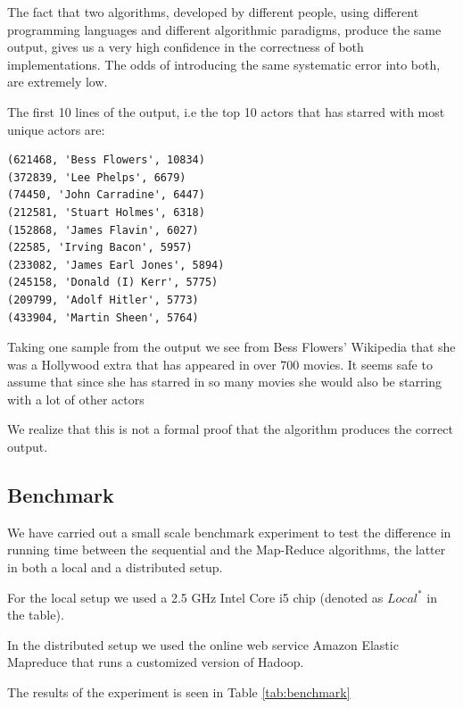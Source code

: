 \documentclass[a4paper,11pt]{article}
\begin{document}
The fact that two algorithms, developed by different people, using different programming languages and different algorithmic paradigms, produce the same output, gives us a very high confidence in the correctness of both implementations. The odds of introducing the same systematic error into both, are extremely low.

The first 10 lines of the output, i.e the top 10 actors that has starred with most unique actors are: 
\begin{verbatim}
(621468, 'Bess Flowers', 10834)
(372839, 'Lee Phelps', 6679)
(74450, 'John Carradine', 6447)
(212581, 'Stuart Holmes', 6318)
(152868, 'James Flavin', 6027)
(22585, 'Irving Bacon', 5957)
(233082, 'James Earl Jones', 5894)
(245158, 'Donald (I) Kerr', 5775)
(209799, 'Adolf Hitler', 5773)
(433904, 'Martin Sheen', 5764)
\end{verbatim}

Taking one sample from the output we see from Bess Flowers' Wikipedia that she was a Hollywood extra that has appeared in over 700 movies. It seems safe to assume that since she has starred in so many movies she would also be starring with a lot of other actors

We realize that this is not a formal proof that the algorithm produces the correct output.

\subsection{Benchmark}
We have carried out a small scale benchmark experiment to test the difference in running time between the sequential and the Map-Reduce algorithms, the latter in both a local and a distributed setup. 

For the local setup we used a 2.5 GHz Intel Core i5 chip (denoted as $Local^*$ in the table). 

In the distributed setup we used the online web service Amazon Elastic Mapreduce that runs a customized version of Hadoop. 

The results of the experiment is seen in Table \ref{tab:benchmark}
\end{document}

